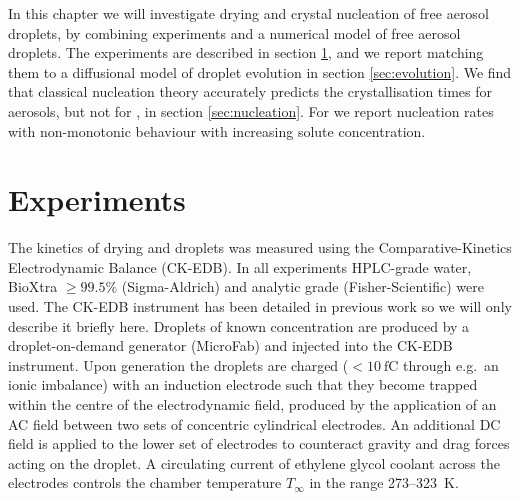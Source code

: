\documentclass[11pt,twoside]{report}
\begin{document}
In this chapter we will investigate drying and crystal nucleation of free aerosol droplets, by combining experiments and a numerical model of free aerosol droplets.
The experiments are described in section \ref{sec:experiments}, and we report matching them to a diffusional model of droplet evolution in section \ref{sec:evolution}.
We find that classical nucleation theory accurately predicts the crystallisation times for  aerosols, but not for , in section \ref{sec:nucleation}.
For  we report nucleation rates with non-monotonic behaviour with increasing solute concentration.

\section{Experiments}
\label{sec:experiments}

The kinetics of drying  and  droplets was measured using the Comparative-Kinetics Electrodynamic Balance (CK-EDB).
In all experiments HPLC-grade water, BioXtra $\ge 99.5\%$  (Sigma-Aldrich) and analytic grade  (Fisher-Scientific) were used.
The CK-EDB instrument has been detailed in previous work \cite{DaviesAST2012} so we will only describe it briefly here.
Droplets of known concentration are produced by a droplet-on-demand generator (MicroFab) and injected into the CK-EDB instrument.
Upon generation the droplets are charged ($<\SI{10}{\femto\coulomb}$ through e.g.\ an ionic imbalance) with an induction electrode such that they become trapped within the centre of the electrodynamic field, produced by the application of an AC field between two sets of concentric cylindrical electrodes.
An additional DC field is applied to the lower set of electrodes to counteract gravity and drag forces acting on the droplet.
A circulating current of ethylene glycol coolant across the electrodes controls the chamber temperature $T_{\infty}$ in the range 273--\SI{323}{\kelvin}.
\end{document}
